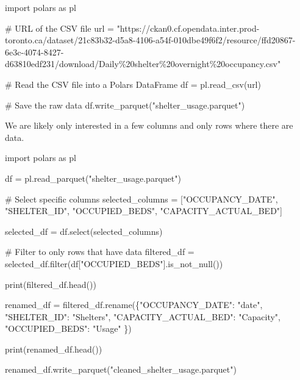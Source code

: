 \documentclass[
  letterpaper,
  DIV=11,
  numbers=noendperiod]{scrartcl}
\newenvironment{Shaded}{\begin{snugshade}}{\end{snugshade}}
\newcommand{\BuiltInTok}[1]{\textcolor[rgb]{0.00,0.23,0.31}{#1}}
\newcommand{\CommentTok}[1]{\textcolor[rgb]{0.37,0.37,0.37}{#1}}
\newcommand{\ImportTok}[1]{\textcolor[rgb]{0.00,0.46,0.62}{#1}}
\newcommand{\NormalTok}[1]{\textcolor[rgb]{0.00,0.23,0.31}{#1}}
\newcommand{\OperatorTok}[1]{\textcolor[rgb]{0.37,0.37,0.37}{#1}}
\newcommand{\SpecialCharTok}[1]{\textcolor[rgb]{0.37,0.37,0.37}{#1}}
\newcommand{\StringTok}[1]{\textcolor[rgb]{0.13,0.47,0.30}{#1}}
\begin{document}
\begin{Shaded}
\begin{Highlighting}[]
\ImportTok{import}\NormalTok{ polars }\ImportTok{as}\NormalTok{ pl}

\CommentTok{\# URL of the CSV file}
\NormalTok{url }\OperatorTok{=} \StringTok{"https://ckan0.cf.opendata.inter.prod{-}toronto.ca/dataset/21c83b32{-}d5a8{-}4106{-}a54f{-}010dbe49f6f2/resource/ffd20867{-}6e3c{-}4074{-}8427{-}d63810edf231/download/Daily}\SpecialCharTok{\%20s}\StringTok{helter}\SpecialCharTok{\%20o}\StringTok{vernight}\SpecialCharTok{\%20o}\StringTok{ccupancy.csv"}

\CommentTok{\# Read the CSV file into a Polars DataFrame}
\NormalTok{df }\OperatorTok{=}\NormalTok{ pl.read\_csv(url)}

\CommentTok{\# Save the raw data}
\NormalTok{df.write\_parquet(}\StringTok{"shelter\_usage.parquet"}\NormalTok{)}
\end{Highlighting}
\end{Shaded}

We are likely only interested in a few columns and only rows where there
are data.

\begin{Shaded}
\begin{Highlighting}[]
\ImportTok{import}\NormalTok{ polars }\ImportTok{as}\NormalTok{ pl}

\NormalTok{df }\OperatorTok{=}\NormalTok{ pl.read\_parquet(}\StringTok{"shelter\_usage.parquet"}\NormalTok{)}

\CommentTok{\# Select specific columns}
\NormalTok{selected\_columns }\OperatorTok{=}\NormalTok{ [}\StringTok{"OCCUPANCY\_DATE"}\NormalTok{, }\StringTok{"SHELTER\_ID"}\NormalTok{, }\StringTok{"OCCUPIED\_BEDS"}\NormalTok{, }\StringTok{"CAPACITY\_ACTUAL\_BED"}\NormalTok{]}

\NormalTok{selected\_df }\OperatorTok{=}\NormalTok{ df.select(selected\_columns)}

\CommentTok{\# Filter to only rows that have data}
\NormalTok{filtered\_df }\OperatorTok{=}\NormalTok{ selected\_df.}\BuiltInTok{filter}\NormalTok{(df[}\StringTok{"OCCUPIED\_BEDS"}\NormalTok{].is\_not\_null())}

\BuiltInTok{print}\NormalTok{(filtered\_df.head())}

\NormalTok{renamed\_df }\OperatorTok{=}\NormalTok{ filtered\_df.rename(\{}\StringTok{"OCCUPANCY\_DATE"}\NormalTok{: }\StringTok{"date"}\NormalTok{,}
                                 \StringTok{"SHELTER\_ID"}\NormalTok{: }\StringTok{"Shelters"}\NormalTok{,}
                                 \StringTok{"CAPACITY\_ACTUAL\_BED"}\NormalTok{: }\StringTok{"Capacity"}\NormalTok{,}
                                 \StringTok{"OCCUPIED\_BEDS"}\NormalTok{: }\StringTok{"Usage"}
\NormalTok{                                 \})}

\BuiltInTok{print}\NormalTok{(renamed\_df.head())}

\NormalTok{renamed\_df.write\_parquet(}\StringTok{"cleaned\_shelter\_usage.parquet"}\NormalTok{)}
\end{Highlighting}
\end{Shaded}
\end{document}
